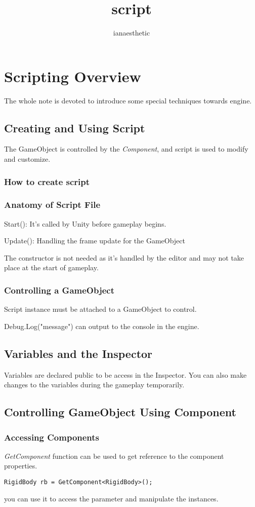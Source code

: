 \documentclass[a4paper, 12pt]{article}
\title{script}
\author{ianaesthetic}
\begin{document}
    \section{Scripting Overview}
        The whole note is devoted to introduce some special techniques towards engine. 
        \subsection{Creating and Using Script}
            The GameObject is controlled by the \emph{Component}, and script is used to modify and customize. 
            \subsubsection{How to create script}
            \subsubsection{Anatomy of Script File}
                Start(): It's called by Unity before gameplay begins.
                
                Update(): Handling the frame update for the GameObject
                
                The constructor is not needed as it's handled by the editor and may not take place at the start of gameplay. 

            \subsubsection{Controlling a GameObject}
                Script instance must be attached to a GameObject to control. 

                Debug.Log("message") can output to the console in the engine. 
            
        \subsection{Variables and the Inspector}
            Variables are declared public to be access in the Inspector. You can also make changes to the variables during the gameplay temporarily. 
        \subsection{Controlling GameObject Using Component}
            \subsubsection{Accessing Components}
                \emph{GetComponent} function can be used to get reference to the component properties. 
\begin{lstlisting}
RigidBody rb = GetComponent<RigidBody>(); 
\end{lstlisting}
                you can use it to access the parameter and manipulate the instances.
\end{document}
